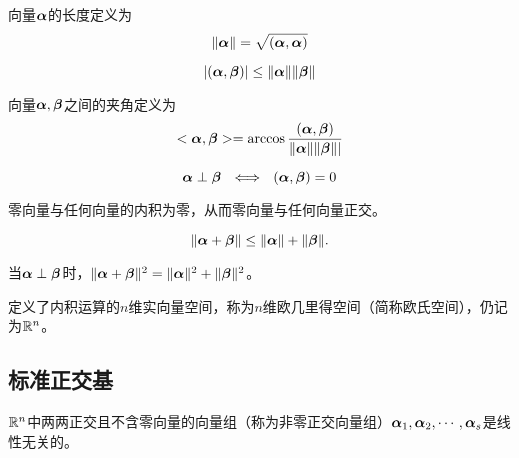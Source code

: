 \begin{frame}\ft{\subsecname}

\begin{dingyi}[向量长度]
  向量$\boldsymbol{\alpha}$的长度定义为
  $$
  \|\boldsymbol{\alpha}\|=\sqrt{(\boldsymbol{\alpha},\boldsymbol{\alpha})}
  $$
\end{dingyi}

\begin{dingli}
  $$
  |(\boldsymbol{\alpha},\boldsymbol{\beta})|\le\|\boldsymbol{\alpha}\|\|\boldsymbol{\beta}\|
  $$
\end{dingli}
\end{frame}

\begin{frame}\ft{\subsecname}

\begin{dingyi}[向量之间的夹角]
  向量$\boldsymbol{\alpha},\boldsymbol{\beta}$之间的夹角定义为
  $$
  <\boldsymbol{\alpha},\boldsymbol{\beta}>=\arccos\frac{(\boldsymbol{\alpha},\boldsymbol{\beta})}{\|\boldsymbol{\alpha}\|\|\boldsymbol{\beta}\||}
  $$
\end{dingyi}

\begin{dingli}
  $$\boldsymbol{\alpha}\perp\boldsymbol{\beta} ~~\Longleftrightarrow~~
  (\boldsymbol{\alpha},\boldsymbol{\beta})=0
  $$
\end{dingli}

\begin{zhu}
零向量与任何向量的内积为零，从而零向量与任何向量正交。
\end{zhu}
\end{frame}

\begin{frame}\ft{\subsecname}

\begin{dingli}[三角不等式]
  $$
  \|\boldsymbol{\alpha}+\boldsymbol{\beta}\|\le\|\boldsymbol{\alpha}\|+\|\boldsymbol{\beta}\|.
  $$
\end{dingli}
\begin{zhu}
当$\boldsymbol{\alpha}\perp\boldsymbol{\beta}$时，$\|\boldsymbol{\alpha}+\boldsymbol{\beta}\|^2=\|\boldsymbol{\alpha}\|^2+\|\boldsymbol{\beta}\|^2$。
\end{zhu}

\begin{dingyi}[欧几里得空间]
  定义了内积运算的$n$维实向量空间，称为$n$维欧几里得空间（简称欧氏空间），仍记为$\mathbb R^n$。
\end{dingyi}
\end{frame}

\subsection{标准正交基}

\begin{frame}\ft{\subsecname}

\begin{dingli}
  $\mathbb R^n$中两两正交且不含零向量的向量组（称为非零正交向量组）$\boldsymbol{\alpha}_1,\boldsymbol{\alpha}_2,\cdots,\boldsymbol{\alpha}_s$是线性无关的。
\end{dingli} 
\end{frame}

